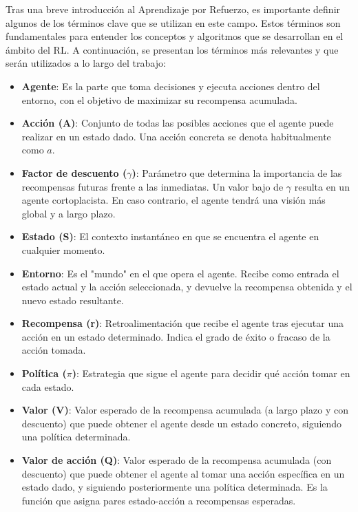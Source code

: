 Tras una breve introducción al Aprendizaje por Refuerzo, es importante definir algunos de los
términos clave que se utilizan en este campo. Estos términos son fundamentales para entender
los conceptos y algoritmos que se desarrollan en el ámbito del RL. A continuación, se presentan
los términos más relevantes y que serán utilizados a lo largo del trabajo:
\cite{wang2022nn_drl}
\begin{itemize}
    \item \textbf{Agente}: Es la parte que toma decisiones y ejecuta acciones dentro del entorno, 
    con el objetivo de maximizar su recompensa acumulada.
    \item \textbf{Acción (A)}: Conjunto de todas las posibles acciones que el agente puede 
    realizar en un estado dado. Una acción concreta se denota habitualmente como \(a\).
    \item \textbf{Factor de descuento (\(\gamma\))}: Parámetro que determina la importancia de las 
    recompensas futuras frente a las inmediatas. Un valor bajo de \(\gamma\) resulta en un agente
    cortoplacista. En caso contrario, el agente tendrá una visión más global y a largo plazo.
    \item \textbf{Estado (S)}: El contexto instantáneo en que se encuentra el agente en cualquier 
    momento.
    \item \textbf{Entorno}: Es el "mundo" en el que opera el agente. Recibe como entrada el estado 
    actual y la acción seleccionada, y devuelve la recompensa obtenida y el nuevo estado resultante.
    \item \textbf{Recompensa (r)}: Retroalimentación que recibe el agente tras ejecutar una acción 
    en un estado determinado. Indica el grado de éxito o fracaso de la acción tomada.
    \item \textbf{Política (\(\pi\))}: Estrategia que sigue el agente para decidir qué acción tomar 
    en cada estado. %
    \item \textbf{Valor (V)}: Valor esperado de la recompensa acumulada (a largo plazo y con 
    descuento) que puede obtener el agente desde un estado concreto, siguiendo una política 
    determinada.
    \item \textbf{Valor de acción (Q)}: Valor esperado de la recompensa acumulada (con descuento) 
    que puede obtener el agente al tomar una acción específica en un estado dado, y siguiendo 
    posteriormente una política determinada. Es la función que asigna pares estado-acción a 
    recompensas esperadas.
\end{itemize}

